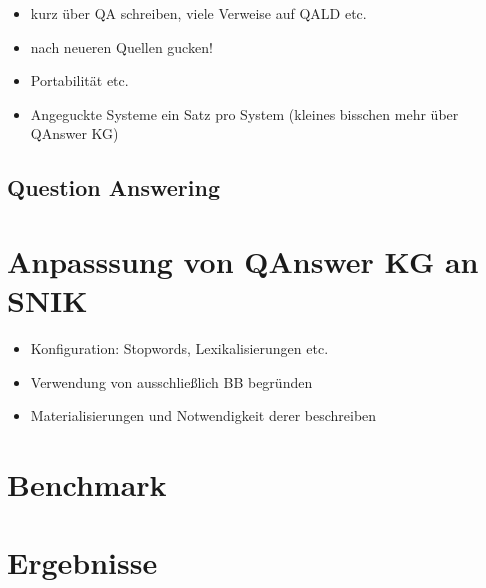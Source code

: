 \documentclass[utf8,biblatex]{lni}
\begin{document}
\begin{itemize}
  \item kurz über QA schreiben, viele Verweise auf QALD etc.
  \item nach neueren Quellen gucken!
  \item Portabilität etc. 
  \item Angeguckte Systeme ein Satz pro System (kleines bisschen mehr über QAnswer KG)
\end{itemize}

\subsection{Question Answering}

\section{Anpasssung von QAnswer KG an SNIK}
\begin{itemize}
  \item Konfiguration: Stopwords, Lexikalisierungen etc.
  \item Verwendung von ausschließlich BB begründen
  \item Materialisierungen und Notwendigkeit derer beschreiben
\end{itemize}

\section{Benchmark}

\section{Ergebnisse}
\end{document}
